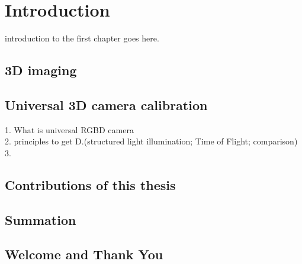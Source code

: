 
\chapter{Introduction} %
\label{sens_introduction} %
introduction to the first chapter goes here.

\section{3D imaging}
\section{Universal 3D camera calibration} %
1. What is universal RGBD camera\\
2. principles to get D.(structured light illumination; Time of Flight; comparison)\\
3. 


\section{Contributions of this thesis}
\section{Summation}
\section{Welcome and Thank You}

